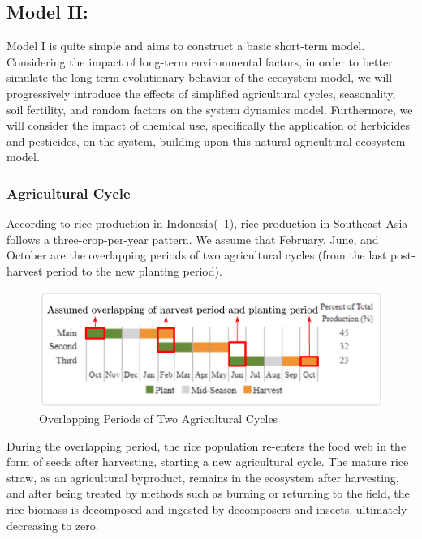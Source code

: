\documentclass{HZNUMCM}
\begin{document}
      
      \subsection{Model II: }
        Model I is quite simple and aims to construct a basic short-term model. 
        Considering the impact of long-term environmental factors, 
        in order to better simulate the long-term evolutionary behavior of the ecosystem model, 
        we will progressively introduce the effects of simplified agricultural cycles, 
        seasonality, soil fertility, and random factors on the system dynamics model. 
        Furthermore, we will consider the impact of chemical use, 
        specifically the application of herbicides and pesticides, on the system, 
        building upon this natural agricultural ecosystem model.

        \subsubsection{Agricultural Cycle}
          According to rice production in Indonesia(\figurename~\ref{fig:PlantModePlus}), 
          rice production in Southeast Asia follows a three-crop-per-year pattern. 
          We assume that February, June, and October are the overlapping periods of two agricultural cycles 
          (from the last post-harvest period to the new planting period).
          \begin{figure}[H]
            \centering
            \includegraphics[width=0.7\linewidth]{images/PlantModePlus.png}
            \caption{Overlapping Periods of Two Agricultural Cycles}
            \label{fig:PlantModePlus}
          \end{figure}
          During the overlapping period, the rice population re-enters the food web in the form of seeds after harvesting, 
          starting a new agricultural cycle. The mature rice straw, as an agricultural byproduct, 
          remains in the ecosystem after harvesting, and after being treated by methods such as burning or returning to the field, 
          the rice biomass is decomposed and ingested by decomposers and insects, ultimately decreasing to zero.
\end{document}
